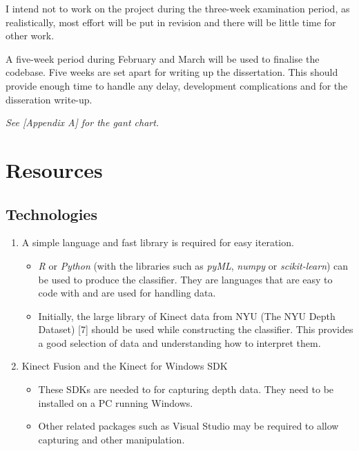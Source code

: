 \documentclass[11pt,openright,a4paper]{report}
\begin{document}
I intend not to work on the project during the three-week examination period, as realistically, most effort will be put in revision and there will be little time for other work.

A five-week period during February and March will be used to finalise the codebase. Five weeks are set apart for writing up the dissertation. This should provide enough time to handle any delay, development complications and for the disseration write-up. 

\textit{See [Appendix A] for the gant chart.}

\newpage


\chapter{Resources}

\section{Technologies}
\begin{enumerate}
  \item A simple language and fast library is required for easy iteration. 
  \begin{itemize}
    \item \textit{R} or \textit{Python} (with the libraries such as \textit{pyML}, \textit{numpy} or \textit{scikit-learn}) can be used to produce the classifier. They are languages that are easy to code with and are used for handling data.
    \item Initially, the large library of Kinect data from NYU (The NYU Depth Dataset) [7] should be used while constructing the classifier. This provides a good selection of data and understanding how to interpret them.
  \end{itemize}
  
  \item Kinect Fusion and the Kinect for Windows SDK
  \begin{itemize}
    \item These SDKs are needed to for capturing depth data. They need to be installed on a PC running Windows.
    \item Other related packages such as Visual Studio may be required to allow capturing and other manipulation.
  \end{itemize}
\end{enumerate}
\end{document}
